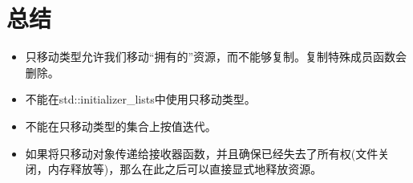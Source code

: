 \section{总结}
\begin{itemize}
	\item 只移动类型允许我们移动“拥有的”资源，而不能够复制。复制特殊成员函数会删除。
	\item 不能在std::initializer_lists中使用只移动类型。
	\item 不能在只移动类型的集合上按值迭代。
	\item 如果将只移动对象传递给接收器函数，并且确保已经失去了所有权(文件关闭，内存释放等)，那么在此之后可以直接显式地释放资源。
\end{itemize}


